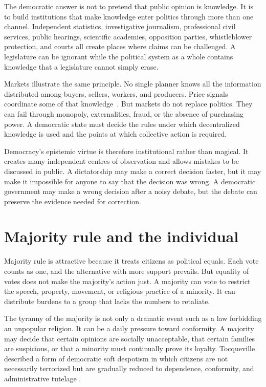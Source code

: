 ﻿\documentclass[12pt,a4paper]{book}
\begin{document}
The democratic answer is not to pretend that public opinion is knowledge.
It is to build institutions that make knowledge enter politics through more
than one channel.  Independent statistics, investigative journalism,
professional civil services, public hearings, scientific academies,
opposition parties, whistleblower protection, and courts all create places
where claims can be challenged.  A legislature can be ignorant while the
political system as a whole contains knowledge that a legislature cannot
simply erase.

Markets illustrate the same principle.  No single planner knows all the
information distributed among buyers, sellers, workers, and producers.
Price signals coordinate some of that knowledge~\cite{Hayek-45}.  But markets do not replace
politics.  They can fail through monopoly, externalities, fraud, or the
absence of purchasing power.  A democratic state must decide the rules under
which decentralized knowledge is used and the points at which collective
action is required.

Democracy's epistemic virtue is therefore institutional rather than
magical.  It creates many independent centres of observation and allows
mistakes to be discussed in public.  A dictatorship may make a correct
decision faster, but it may make it impossible for anyone to say that the
decision was wrong.  A democratic government may make a wrong decision
after a noisy debate, but the debate can preserve the evidence needed for
correction.

\section{Majority rule and the individual}

Majority rule is attractive because it treats citizens as political equals.
Each vote counts as one, and the alternative with more support prevails.
But equality of votes does not make the majority's action just.  A majority
can vote to restrict the speech, property, movement, or religious practice
of a minority.  It can distribute burdens to a group that lacks the numbers
to retaliate.

The tyranny of the majority is not only a dramatic event such as a law
forbidding an unpopular religion.  It can be a daily pressure toward
conformity.  A majority may decide that certain opinions are socially
unacceptable, that certain families are suspicious, or that a minority must
continually prove its loyalty.  Tocqueville described a form of democratic
soft despotism in which citizens are not necessarily terrorized but are
gradually reduced to dependence, conformity, and administrative tutelage
\cite{Tocqueville1835}.
\end{document}
